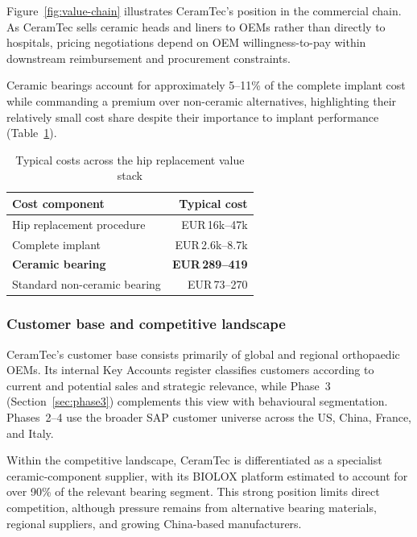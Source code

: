\documentclass{article}
\begin{document}
Figure~\ref{fig:value-chain} illustrates CeramTec’s position in the commercial chain. As CeramTec sells ceramic heads and liners to OEMs rather than directly to hospitals, pricing negotiations depend on OEM willingness-to-pay within downstream reimbursement and procurement constraints.

Ceramic bearings account for approximately 5--11\% of the complete implant cost while commanding a premium over non-ceramic alternatives, highlighting their relatively small cost share despite their importance to implant performance (Table~\ref{tab:typical-costs}).

\begin{table}[H]
\centering
\small

\begin{tabularx}{0.85\textwidth}{@{}X r@{}}
\toprule
\textbf{Cost component} & \textbf{Typical cost} \\
\midrule
Hip replacement procedure & EUR\,16k--47k \\
Complete implant & EUR\,2.6k--8.7k \\
\textbf{Ceramic bearing} & \textbf{EUR\,289--419} \\
Standard non-ceramic bearing & EUR\,73--270 \\
\bottomrule
\end{tabularx}

\caption{Typical costs across the hip replacement value stack}
\label{tab:typical-costs}

\end{table}


\subsubsection{Customer base and competitive landscape}

CeramTec's customer base consists primarily of global and regional orthopaedic OEMs. Its internal Key Accounts register classifies customers according to current and potential sales and strategic relevance, while Phase~3 (Section~\ref{sec:phase3}) complements this view with behavioural segmentation. Phases~2--4 use the broader SAP customer universe across the US, China, France, and Italy.

Within the competitive landscape, CeramTec is differentiated as a specialist ceramic-component supplier, with its BIOLOX\textregistered{} platform estimated to account for over 90\% of the relevant bearing segment. This strong position limits direct competition, although pressure remains from alternative bearing materials, regional suppliers, and growing China-based manufacturers.
\end{document}
